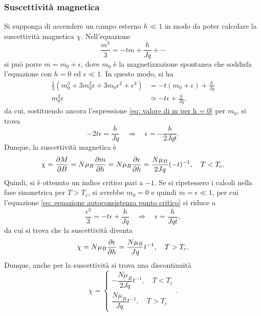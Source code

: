 \subsubsection{Suscettività magnetica}
Si supponga di accendere un campo esterno $h \ll 1$ in modo da poter calcolare la suscettività magnetica $\chi$. Nell'equazione
\begin{equation}
    \frac{m^3}{3} = -t m + \frac{h}{J q} + \cdots
\end{equation}
si può porre $m = m_0 + \epsilon$,  dove $m_0$ è la magnetizzazione spontanea che soddisfa l'equazione con $h = 0$ ed $\epsilon \ll 1$. In questo modo, si ha
\begin{equation}
\label{eq: equazione autoconsistenza punto critico}
    \begin{split}
        \frac{1}{3} ( m_0^3 + 3 m_0^2 \epsilon + 3 m_0 \epsilon^2 + \epsilon^3) &= -t(m_0 + \epsilon) + \frac{h}{Jq} \\
        m_0^2\epsilon &\simeq -t\epsilon + \frac{h}{Jq},
    \end{split}
\end{equation}
da cui, sostituendo ancora l'espressione \eqref{eq: valore di m per h = 0} per $m_0$, si trova
\begin{equation}
    -2t \epsilon = \frac{h}{J q} \quad\Longrightarrow\quad \epsilon = -\frac{h}{2Jqt}.
\end{equation}
Dunque, la suscettività magnetica è
\begin{equation}
    \chi = \frac{\partial M}{\partial B} = N \mu_B \frac{\partial m}{\partial h} = N \mu_B \frac{\partial \epsilon}{\partial h} = \frac{N \mu_B}{2 J q} (-t)^{-1},\quad T < T_c.
\end{equation}
Quindi, si è ottenuto un indice critico pari a $-1$. Se si ripetessero i calcoli nella fase simmetrica per $T > T_c$, si avrebbe $m_0 = 0$ e quindi $m = \epsilon \ll 1$, per cui l'equazione \eqref{eq: equazione autoconsistenza punto critico} si riduce a 
\begin{equation}
    \frac{\epsilon^3}{3} = -t \epsilon + \frac{h}{J q}
    \quad\Longrightarrow\quad \epsilon = \frac{h}{J q t},
\end{equation}
da cui si trova che la suscettività diventa
\begin{equation}
    \chi = N \mu_B \frac{\partial \epsilon}{\partial h} = \frac{N \mu_B}{J q} t^{-1},\quad T > T_c.
\end{equation}
Dunque, anche per la suscettività si trova una discontinuità
\begin{equation}
    \chi =
    \begin{cases}
        -\dfrac{N \mu_B}{2 J q}t^{-1},\quad T<T_c \\[2ex]
        \dfrac{N \mu_B}{J q} t^{-1},\quad T>T_c
    \end{cases}.
\end{equation}


